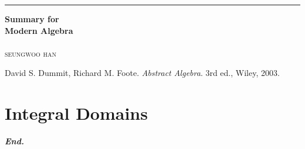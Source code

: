 \documentclass[a4paper,12pt]{report}
\begin{document}

\begin{titlepage}
	\raggedleft

	\rule{1pt}{\textheight}
	\hspace{0.05\textwidth}
	\parbox[b]{0.75\textwidth}{

        {\Huge\bfseries Summary for\\[0.5\baselineskip] Modern Algebra }\\[2\baselineskip]
		\\[4\baselineskip]
		{\Large\textsc{seungwoo han}}

		\vspace{0.5\textheight}

        {\noindent
        David S. Dummit, Richard M. Foote.
        \textit{Abstract Algebra}. \newline
        3rd ed., Wiley, 2003.}
	}
\end{titlepage}
\tableofcontents
\hypersetup{
    linkcolor=red!50!black,
    filecolor=black,
    urlcolor=red!50!black,
}
\pagebreak


\chapter{Integral Domains}



\vfill
\begin{center}
    \textbf{\textit{End.}}
\end{center}
\end{document}

